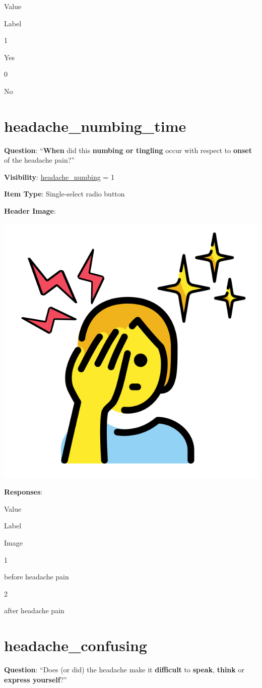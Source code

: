 \documentclass[]{book}
\begin{document}
Value

Label

1

Yes

0

No

\hypertarget{headache_numbing_time}{%
\section{headache\_numbing\_time}\label{headache_numbing_time}}

\textbf{Question}: ``\textbf{When} did this \textbf{numbing or tingling} occur with respect to \textbf{onset} of the headache pain?''

\textbf{Visibility}: \protect\hyperlink{headache_numbing}{headache\_numbing} = 1

\textbf{Item Type}: Single-select radio button

\textbf{Header Image}:

\begin{flushleft}\includegraphics[width=0.33\linewidth]{downloadFigs4latex_NIMH_Applet_Codebook/headache_numbing_time_headerImg} \end{flushleft}

\textbf{Responses}:

Value

Label

Image

1

before headache pain

2

after headache pain

\hypertarget{headache_confusing}{%
\section{headache\_confusing}\label{headache_confusing}}

\textbf{Question}: ``Does (or did) the headache make it \textbf{difficult} to \textbf{speak}, \textbf{think} or \textbf{express yourself}?''
\end{document}

